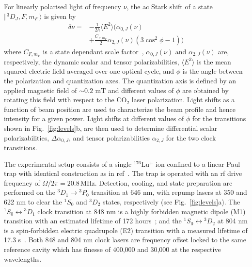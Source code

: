 \documentclass[pra,aps,showpacs,floatfix,twocolumn,nofootinbib,citeautoscript]{revtex4-1}
\def\ket#1{|\,#1 \,\rangle}
\newcommand{\fref}[1]{Fig.~\ref{#1}}
\begin{document}
 For linearly polarised light of frequency $\nu$, the ac Stark shift of a state $\ket{{^3}D_J,F,m_F}$  is given by~\cite{arora2007magic,polarizability2013}
\begin{equation}
\begin{split}
 \delta\nu =& -\frac{1}{2h} \langle E^2\rangle \bigg( \alpha_{0,J}(\nu) \\
& + \frac{C_{F,m_F}}{2} \alpha_{2,J}(\nu)  (3 \cos^2{\phi}-1)\bigg)
\end{split}
\label{eq:polarizabiltiy}
\end{equation}
where $C_{F,m_F}$ is a state dependant scale factor~\cite{polarizability2013}, $\alpha_{0,J}(\nu)$ and $\alpha_{2,J}(\nu)$ are, respectively, the dynamic scalar and tensor polarizabilities,  $\langle E^2\rangle$ is the mean squared electric field averaged over one optical cycle, and $\phi$ is the angle between the polarization and quantization axes.  The quantization axis is defined by an applied magnetic field of $\sim 0.2$ mT and different values of $\phi$ are obtained by rotating this field with respect to the CO$_2$ laser polarization.  Light shifts as a function of beam position are used to characterize the beam profile and hence intensity for a given power. Light shifts at different values of $\phi$ for the transitions shown in \fref{fig:levels}b, are then used to determine differential scalar polarizabilities, $\Delta \alpha_{0,J}$, and tensor polarizabilities $\alpha_{2,J}$ for the two clock transitions. 

 The experimental setup consists of a single $^{176}$Lu$^+$ ion confined to a linear Paul trap with identical construction as in ref~\cite{dean2017}.  The trap is operated with an rf drive frequency of $\Omega/2\pi = 20.8\,\mathrm{MHz}$. Detection, cooling, and state preparation are performed on the $^3D_1 \rightarrow {^3}P_0$ transition at 646 nm, with repump lasers at 350 and 622 nm to clear the $^1S_0$ and $^3D_2$ states, respectively (see \fref{fig:levels}a). The $^1S_0 \leftrightarrow  {^3}D_1$ clock transition at 848 nm is a highly forbidden magnetic dipole (M1) transition with an estimated lifetime of 172 hours~\cite{kja175}; and the $^1S_0 \leftrightarrow {^3}D_2$ at 804 nm is a spin-forbidden electric quadrupole (E2) transition with a measured lifetime of 17.3 s~\cite{luprop2016}.  Both 848 and 804 nm clock lasers are frequency offset locked to the same reference cavity which has finesse of 400,000 and 30,000 at the respective wavelengths.
\end{document}
